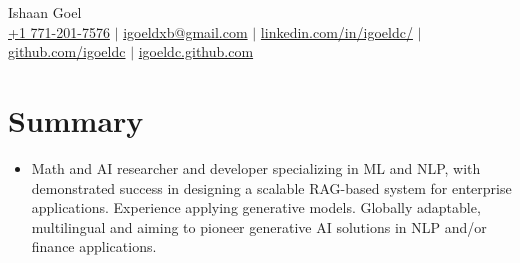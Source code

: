 \documentclass[letterpaper,10pt]{article}
\newcommand\indentsize{10pt}
\newcommand{\resumeSubHeadingListStart}{\begin{itemize}[leftmargin=0.15in, label=]}
\newcommand{\resumeSubHeadingListEnd}{\end{itemize}}
\begin{document}

\begin{center}
    \Huge Ishaan Goel \\ \vspace{2pt}
    \large
    \href{tel:17712017576}{+1 771-201-7576}
    $|$ \href{mailto:igoeldxb@gmail.com}{igoeldxb@gmail.com}
    $|$ \href{https://linkedin.com/in/igoeldc/}{linkedin.com/in/igoeldc/}
    $|$ \href{https://github.com/igoeldc}{github.com/igoeldc}
    $|$ \href{https://igoeldc.github.io}{igoeldc.github.com}
\end{center}

\section{Summary}
  \resumeSubHeadingListStart
    \item{Math and AI researcher and developer specializing in ML and NLP, with demonstrated success in designing a scalable RAG-based system for enterprise applications. Experience applying generative models. Globally adaptable, multilingual and aiming to pioneer generative AI solutions in NLP and/or finance applications.}\vspace{-5pt}
  \resumeSubHeadingListEnd

\newcommand{\resumeEducationHeading}[9]{
  \item
    \begin{tabular*}{0.97\textwidth}[t]{l@{\extracolsep{\fill}}r}
      \textbf{#1} {#2} & #3 \\
      \hspace{\indentsize} #4 & #5 \\
      \hspace{20pt} #6 & \\
      \hspace{20pt} \textit{#7} & \\
      \hspace{\indentsize} #8 & #9
    \end{tabular*}
}
\end{document}

